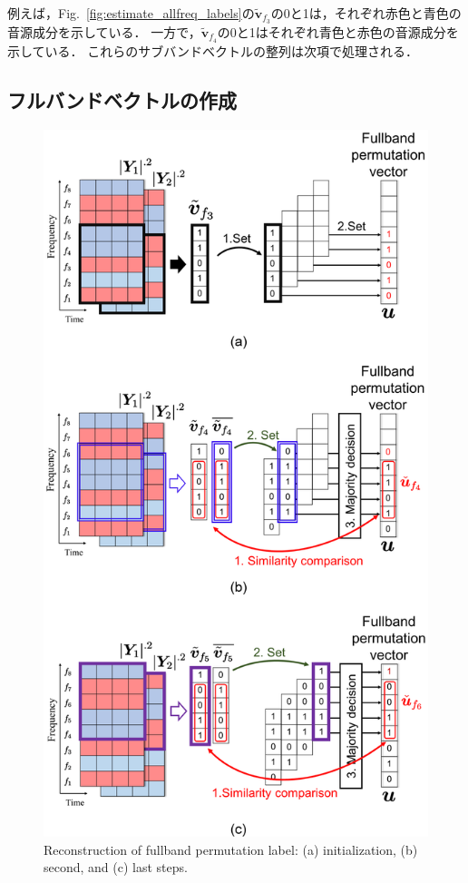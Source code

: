 例えば，Fig.~\ref{fig:estimate_allfreq_labels}の$\tilde{\bm{v}}_{f_3}$の0と1は，それぞれ赤色と青色の音源成分を示している．
一方で，$\tilde{\bm{v}}_{f_4}$の0と1はそれぞれ青色と赤色の音源成分を示している．
これらのサブバンドベクトルの整列は次項で処理される．

\subsection{フルバンドベクトルの作成}
\label{sec:fullband}
\begin{figure}[!th]
    \begin{center}
        \includegraphics[width=0.8\columnwidth]{figures/make_sortlabel_step1.eps}
    \end{center}
    \vspace{-15pt}
	\caption{Reconstruction of fullband permutation label: (a) initialization, (b) second, and (c) last steps.}
	\label{fig:make_sortlabel_step}
	\vspace{-8pt}   %
\end{figure}

